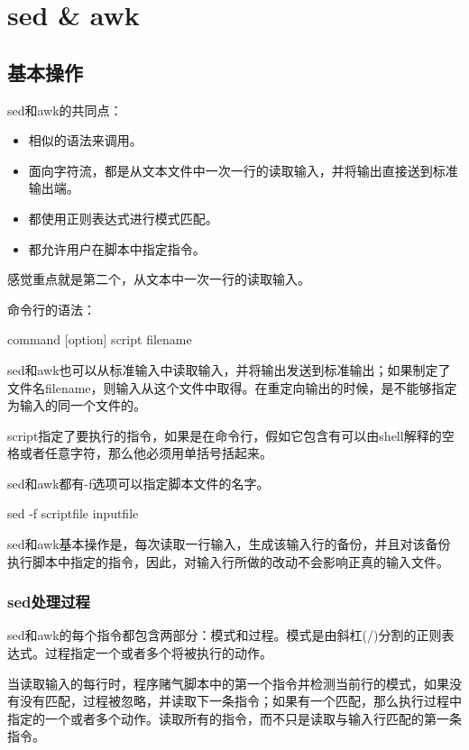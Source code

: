 \section{sed \& awk}

\subsection{基本操作}

sed和awk的共同点：
\begin{itemize}
\item 相似的语法来调用。
\item 面向字符流，都是从文本文件中一次一行的读取输入，并将输出直接送到标准输出端。
\item 都使用正则表达式进行模式匹配。
\item 都允许用户在脚本中指定指令。
\end{itemize}

感觉重点就是第二个，从文本中一次一行的读取输入。


命令行的语法：
\begin{Command-Line}
command [option] script filename
\end{Command-Line}

sed和awk也可以从标准输入中读取输入，并将输出发送到标准输出；如果制定了文件名filename，则输入从这个文件中取得。在重定向输出的时候，是不能够指定为输入的同一个文件的。

script指定了要执行的指令，如果是在命令行，假如它包含有可以由shell解释的空格或者任意字符，那么他必须用单括号括起来。

sed和awk都有-f选项可以指定脚本文件的名字。

\begin{Command-Line}
sed -f scriptfile inputfile
\end{Command-Line}

sed和awk基本操作是，每次读取一行输入，生成该输入行的备份，并且对该备份执行脚本中指定的指令，因此，对输入行所做的改动不会影响正真的输入文件。


\subsubsection{sed处理过程}
sed和awk的每个指令都包含两部分：模式和过程。模式是由斜杠(/)分割的正则表达式。过程指定一个或者多个将被执行的动作。

当读取输入的每行时，程序赌气脚本中的第一个指令并检测当前行的模式，如果没有没有匹配，过程被忽略，并读取下一条指令；如果有一个匹配，那么执行过程中指定的一个或者多个动作。读取所有的指令，而不只是读取与输入行匹配的第一条指令。


